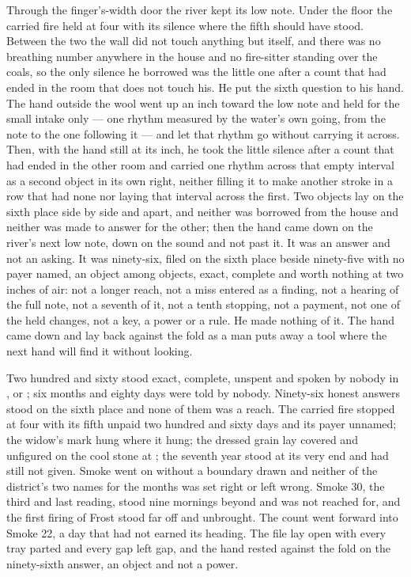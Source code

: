 Through the finger's-width door the river kept its low note. Under the floor the carried fire held at four with its silence where the fifth should have stood. Between the two the wall did not touch anything but itself, and there was no breathing number anywhere in the house and no fire-sitter standing over the coals, so the only silence he borrowed was the little one after a count that had ended in the room that does not touch his. He put the sixth question to his hand. The hand outside the wool went up an inch toward the low note and held for the small intake only --- one rhythm measured by the water's own going, from the note to the one following it --- and let that rhythm go without carrying it across. Then, with the hand still at its inch, he took the little silence after a count that had ended in the other room and carried one rhythm across that empty interval as a second object in its own right, neither filling it to make another stroke in a row that had none nor laying that interval across the first. Two objects lay on the sixth place side by side and apart, and neither was borrowed from the house and neither was made to answer for the other; then the hand came down on the river's next low note, down on the sound and not past it. It was an answer and not an asking. It was ninety-six, filed on the sixth place beside ninety-five with no payer named, an object among objects, exact, complete and worth nothing at two inches of air: not a longer reach, not a miss entered as a finding, not a hearing of the full note, not a seventh of it, not a tenth stopping, not a payment, not one of the held changes, not a key, a power or a rule. He made nothing of it. The hand came down and lay back against the fold as a man puts away a tool where the next hand will find it without looking.

Two hundred and sixty stood exact, complete, unspent and spoken by nobody in ,  or ; six months and eighty days were told by nobody. Ninety-six honest answers stood on the sixth place and none of them was a reach. The carried fire stopped at four with its fifth unpaid two hundred and sixty days and its payer unnamed; the widow's mark hung where it hung; the dressed grain lay covered and unfigured on the cool stone at ; the seventh year stood at its very end and had still not given. Smoke went on without a boundary drawn and neither of the district's two names for the months was set right or left wrong. Smoke 30, the third and last reading, stood nine mornings beyond and was not reached for, and the first firing of Frost stood far off and unbrought. The count went forward into Smoke 22, a day that had not earned its heading. The file lay open with every tray parted and every gap left gap, and the hand rested against the fold on the ninety-sixth answer, an object and not a power.
